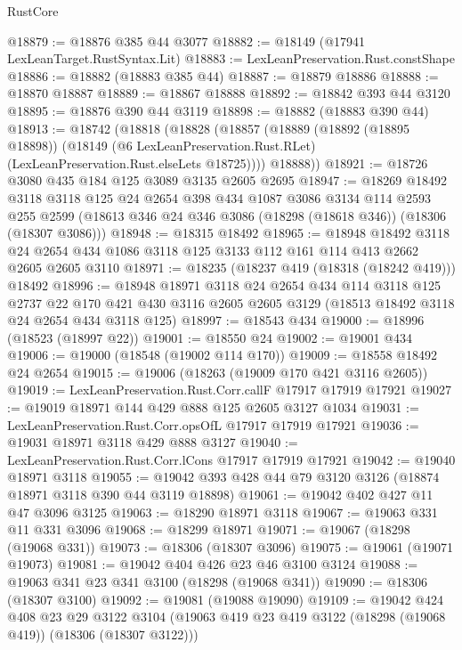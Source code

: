 \begin{lexlean}{RustCore}
\begin{coremodule}
@18879 := @18876 @385 @44 @3077
@18882 := @18149 (@17941 LexLeanTarget.RustSyntax.Lit)
@18883 := LexLeanPreservation.Rust.constShape
@18886 := @18882 (@18883 @385 @44)
@18887 := @18879 @18886
@18888 := @18870 @18887
@18889 := @18867 @18888
@18892 := @18842 @393 @44 @3120
@18895 := @18876 @390 @44 @3119
@18898 := @18882 (@18883 @390 @44)
@18913 := @18742
    (@18818
      (@18828
        (@18857
          (@18889
            (@18892 (@18895 @18898))
            (@18149 (@6 LexLeanPreservation.Rust.RLet) (LexLeanPreservation.Rust.elseLets @18725))))
        @18888))
@18921 := @18726 @3080 @435 @184 @125 @3089 @3135 @2605 @2695
@18947 := @18269
    @18492
    @3118
    @3118
    @125
    @24
    @2654
    @398
    @434
    @1087
    @3086
    @3134
    @114
    @2593
    @255
    @2599
    (@18613 @346 @24 @346 @3086 (@18298 (@18618 @346)) (@18306 (@18307 @3086)))
@18948 := @18315 @18492
@18965 := @18948
    @18492
    @3118
    @24
    @2654
    @434
    @1086
    @3118
    @125
    @3133
    @112
    @161
    @114
    @413
    @2662
    @2605
    @2605
    @3110
@18971 := @18235 (@18237 @419 (@18318 (@18242 @419))) @18492
@18996 := @18948
    @18971
    @3118
    @24
    @2654
    @434
    @114
    @3118
    @125
    @2737
    @22
    @170
    @421
    @430
    @3116
    @2605
    @2605
    @3129
    (@18513 @18492 @3118 @24 @2654 @434 @3118 @125)
@18997 := @18543 @434
@19000 := @18996 (@18523 (@18997 @22))
@19001 := @18550 @24
@19002 := @19001 @434
@19006 := @19000 (@18548 (@19002 @114 @170))
@19009 := @18558 @18492 @24 @2654
@19015 := @19006 (@18263 (@19009 @170 @421 @3116 @2605))
@19019 := LexLeanPreservation.Rust.Corr.callF @17917 @17919 @17921
@19027 := @19019 @18971 @144 @429 @888 @125 @2605 @3127 @1034
@19031 := LexLeanPreservation.Rust.Corr.opsOfL @17917 @17919 @17921
@19036 := @19031 @18971 @3118 @429 @888 @3127
@19040 := LexLeanPreservation.Rust.Corr.lCons @17917 @17919 @17921
@19042 := @19040 @18971 @3118
@19055 := @19042 @393 @428 @44 @79 @3120 @3126 (@18874 @18971 @3118 @390 @44 @3119 @18898)
@19061 := @19042 @402 @427 @11 @47 @3096 @3125
@19063 := @18290 @18971 @3118
@19067 := @19063 @331 @11 @331 @3096
@19068 := @18299 @18971
@19071 := @19067 (@18298 (@19068 @331))
@19073 := @18306 (@18307 @3096)
@19075 := @19061 (@19071 @19073)
@19081 := @19042 @404 @426 @23 @46 @3100 @3124
@19088 := @19063 @341 @23 @341 @3100 (@18298 (@19068 @341))
@19090 := @18306 (@18307 @3100)
@19092 := @19081 (@19088 @19090)
@19109 := @19042
    @424
    @408
    @23
    @29
    @3122
    @3104
    (@19063 @419 @23 @419 @3122 (@18298 (@19068 @419)) (@18306 (@18307 @3122)))

\end{coremodule}
\end{lexlean}
